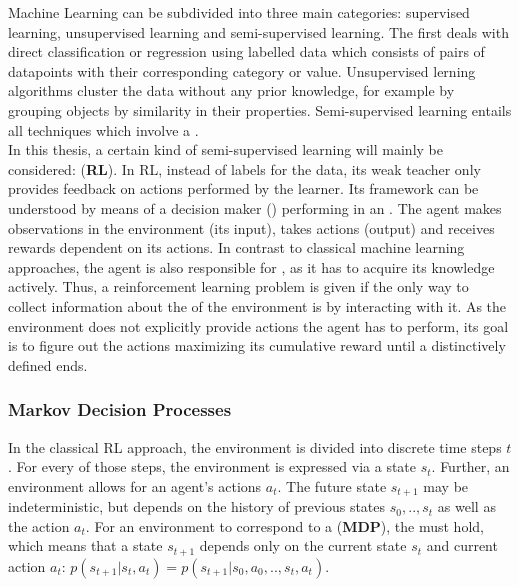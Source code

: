 Machine Learning can be subdivided into three main categories: supervised learning, unsupervised learning and semi-supervised learning. The first deals with direct classification or regression using labelled data which consists of pairs of datapoints with their corresponding category or value. Unsupervised lerning algorithms cluster the data without any prior knowledge, for example by grouping objects by similarity in their properties. Semi-supervised learning entails all techniques which involve a .\\
In this thesis, a certain kind of semi-supervised learning will mainly be considered:  (\textbf{RL}). In RL, instead of labels for the data, its weak teacher only provides feedback on actions performed by the learner. Its framework can be understood by means of a decision maker () performing in an . The agent makes observations in the environment (its input), takes actions (output) and receives rewards dependent on its actions. In contrast to classical machine learning approaches, the agent is also responsible for , as it has to acquire its knowledge actively. Thus, a reinforcement learning problem is given if the only way to collect information about the  of the environment is by interacting with it. As the environment does not explicitly provide actions the agent has to perform, its goal is to figure out the actions maximizing its cumulative reward until a distinctively defined  ends.

\subsubsection{Markov Decision Processes} \label{ch:mdps}

In the classical RL approach, the environment is divided into discrete time steps $t$. For every of those steps, the environment is expressed via a state $s_t$. Further, an environment allows for an agent's actions $a_t$. The future state $s_{t+1}$ may be indeterministic, but depends on the history of previous states $s_0, .., s_t$ as well as the action $a_t$. For an environment to correspond to a  (\textbf{MDP}), the  must hold, which means that  a state  $s_{t+1}$ depends only on the current state $s_t$ and current action $a_t$: $p(s_{t+1}|s_t,a_t) = p(s_{t+1}|s_0,a_0,..,s_t,a_t)$.

